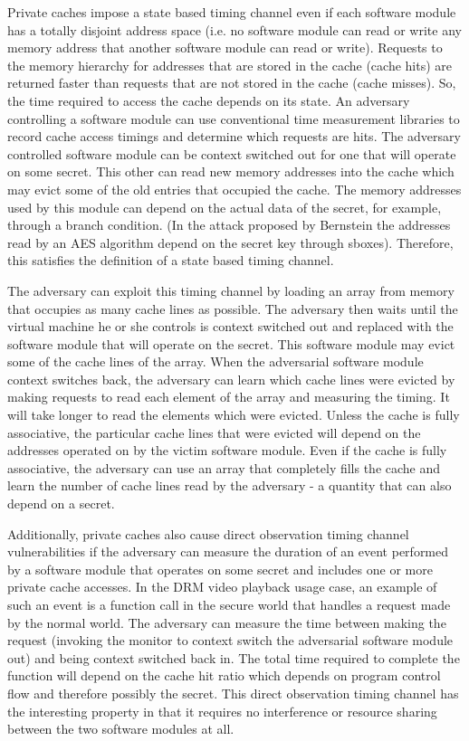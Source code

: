 Private caches impose a state based timing channel even if each software module 
has a totally disjoint address space (i.e. no software module can read or write 
any memory address that another software module can read or write). Requests to 
the memory hierarchy for addresses that are stored in the cache (cache hits) 
are returned faster than requests that are not stored in the cache (cache 
misses). So, the time required to access the cache depends on its state. An 
adversary controlling a software module can use conventional time measurement 
libraries to record cache access timings and determine which requests are hits.
The adversary controlled software module can be context switched out for one 
that will operate on some secret. This other can read new memory addresses into 
the cache which may evict some of the old entries that occupied the cache. The 
memory addresses used by this module can depend on the actual data of the 
secret, for example, through a branch condition. (In the attack proposed by 
Bernstein \cite{bernstein} the addresses read by an AES algorithm depend on the 
secret key through sboxes). Therefore, this satisfies the definition of a state 
based timing channel.

The adversary can exploit this timing channel by loading an array from memory 
that occupies as many cache lines as possible. The adversary then waits until 
the virtual machine he or she controls is context switched out and replaced 
with the software module that will operate on the secret. This software module 
may evict some of the cache lines of the array. When the adversarial software 
module context switches back, the adversary can learn which cache lines were 
evicted by making requests to read each element of the array and measuring the 
timing. It will take longer to read the elements which were evicted. Unless the 
cache is fully associative, the particular cache lines that were evicted will 
depend on the addresses operated on by the victim software module. Even if the 
cache is fully associative, the adversary can use an array that completely 
fills the cache and learn the number of cache lines read by the adversary - a 
quantity that can also depend on a secret.

Additionally, private caches also cause direct observation timing channel 
vulnerabilities if the adversary can measure the duration of an event performed 
by a software module that operates on some secret and includes one or more 
private cache
accesses. In the DRM video playback usage case, an example of such an event is 
a function call in the secure world that handles a request made by the normal 
world. The adversary can measure the time between making the request (invoking
the monitor to context switch the adversarial software module out) and being 
context switched back in. The total time required to complete the function will 
depend on the cache hit ratio which depends on program control flow and 
therefore possibly the secret. This direct observation timing channel has the 
interesting property in that it requires no interference or resource sharing 
between the two software modules at all.
 
